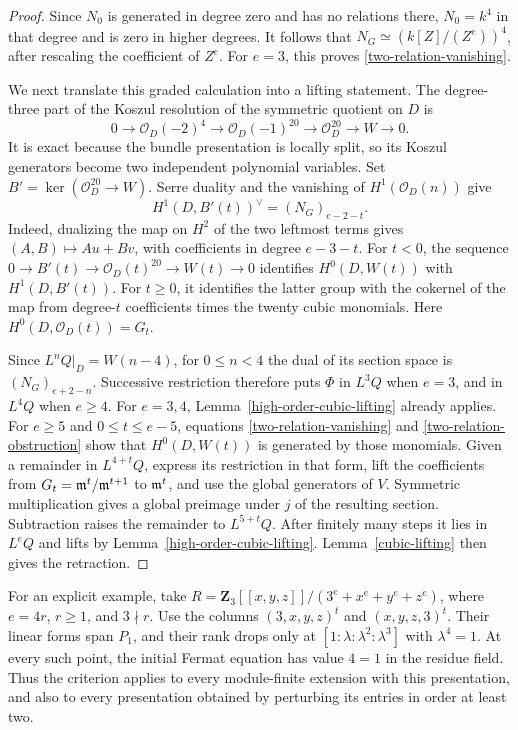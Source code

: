 \begin{proof}
Since $N_0$ is generated in degree zero and has no relations there,
$N_0=k^4$ in that degree and is zero in higher degrees.
It follows that
$N_G\simeq(k[Z]/(Z^e))^4$, after rescaling the coefficient of $Z^e$.
For $e=3$, this proves \eqref{two-relation-vanishing}.

We next translate this graded calculation into a lifting statement.
The degree-three part of the Koszul resolution of the symmetric
quotient on $D$ is
\[
 0\to\mathcal O_D(-2)^4\to\mathcal O_D(-1)^{20}
 \to\mathcal O_D^{20}\to W\to0 .
\]
It is exact because the bundle presentation is locally split, so its
Koszul generators become two independent polynomial variables.
Set $B'=\ker(\mathcal O_D^{20}\to W)$.
Serre duality and the vanishing of $H^1(\mathcal O_D(n))$ give
\begin{equation}\label{two-relation-obstruction}
 H^1(D,B'(t))^\vee=(N_G)_{e-2-t}.
\end{equation}
Indeed, dualizing the map on $H^2$ of the two leftmost terms gives
$(A,B)\mapsto Au+Bv$, with coefficients in degree $e-3-t$.
For $t<0$, the sequence
$0\to B'(t)\to\mathcal O_D(t)^{20}\to W(t)\to0$ identifies
$H^0(D,W(t))$ with $H^1(D,B'(t))$.
For $t\ge0$, it identifies the latter group with the cokernel of
the map from degree-$t$ coefficients times the twenty cubic monomials.
Here $H^0(D,\mathcal O_D(t))=G_t$.

Since $L^nQ|_D=W(n-4)$, for $0\le n<4$ the dual of its section
space is $(N_G)_{e+2-n}$.
Successive restriction therefore puts $\Phi$ in $L^3Q$ when $e=3$,
and in $L^4Q$ when $e\ge4$.
For $e=3,4$, Lemma~\ref{high-order-cubic-lifting} already applies.
For $e\ge5$ and $0\le t\le e-5$, equations
\eqref{two-relation-vanishing} and \eqref{two-relation-obstruction}
show that $H^0(D,W(t))$ is generated by those monomials.
Given a remainder in $L^{4+t}Q$, express its restriction in that form,
lift the coefficients from $G_t=\mathfrak m^t/\mathfrak m^{t+1}$ to $\mathfrak m^t$, and use the
global generators of $V$.
Symmetric multiplication gives a global preimage under $j$ of the
resulting section.  Subtraction raises the remainder to $L^{5+t}Q$.
After finitely many steps it lies in $L^eQ$ and lifts by
Lemma~\ref{high-order-cubic-lifting}.
Lemma~\ref{cubic-lifting} then gives the retraction.
\end{proof}

For an explicit example, take
$R=\mathbf Z_3[[x,y,z]]/(3^e+x^e+y^e+z^e)$, where
$e=4r$, $r\ge1$, and $3\nmid r$.
Use the columns $(3,x,y,z)^t$ and $(x,y,z,3)^t$.
Their linear forms span $P_1$, and their rank drops only at
$[1:\lambda:\lambda^2:\lambda^3]$ with $\lambda^4=1$.
At every such point, the initial Fermat equation has value $4=1$ in
the residue field.
Thus the criterion applies to every module-finite extension with this
presentation, and also to every presentation obtained by perturbing
its entries in order at least two.

